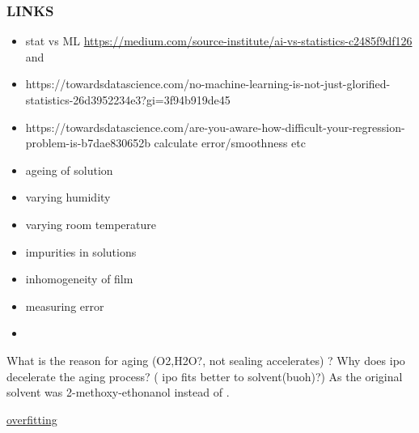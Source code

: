 \subsubsection{LINKS}
\begin{itemize}
    \item stat vs ML \url{https://medium.com/source-institute/ai-vs-statistics-c2485f9df126} and 
    \item https://towardsdatascience.com/no-machine-learning-is-not-just-glorified-statistics-26d3952234e3?gi=3f94b919de45
    \item https://towardsdatascience.com/are-you-aware-how-difficult-your-regression-problem-is-b7dae830652b calculate error/smoothness etc
\end{itemize}

\begin{itemize} 
    \item ageing of solution 
    \item varying humidity
    \item varying room temperature 
    \item impurities in solutions
    \item inhomogeneity of film 
    \item measuring error
    \item 
\end{itemize}

What is the reason for aging (O2,H2O?, not sealing accelerates) ? 
Why does \gls{ipo} decelerate the aging process? ( ipo fits better to solvent(buoh)?)
As the original solvent was 2-methoxy-ethonanol instead of . 

\href{https://pubs.acs.org/doi/10.1021/ci0342472}{overfitting}

